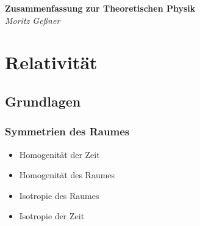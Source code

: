 \documentclass[11pt]{article}
\author{Moritz Geßner}
\numberwithin{equation}{section}
\begin{document}
  \newcommand{\xrowht}[2][0]
  {
    \addstackgap[.5\dimexpr#2\relax]{\vphantom{#1}}
  }
	\newcommand{\diff}
	{
		\mathrm{d}
	}
	\newcommand{\binomkoeff}[2]
	{
		\left(\begin{matrix}#1\\#2\end{matrix}\right)
	}
  \newcommand{\pvec}[1]
  {
    \vec{#1}\mkern2mu\vphantom{#1} %
  }
  \newcommand{\tder}[2] %
  {
    \frac{\diff #1}{\diff #2}
  }
  \newcommand{\pder}[2] %
  {
    \frac{\partial #1}{\partial #2}
  }
  \newcommand{\dpder}[2] %
  {
    \dfrac{\partial #1}{\partial #2}
  }
  \newcommand{\Nabla}
  {
    \vec{\nabla}
  }
  \newcommand{\unitvec}[1]
  {
    \vec{e}_{#1}
  }
  \newcommand{\com}[2] %
  {
    \left[#1,#2\right]
  }
  \newcommand{\anticom}[2] %
  {
    \left[#1,#2\right]_{+}
  }
  \newcommand{\konst}
  {
    \mathrm{konst.}
  }
  \newcommand{\customEq}[1]
  {
    \stackrel{#1}{=}
  }
  \newcommand*{\rom}[1]
  {
    \uppercase\expandafter{\romannumeral #1\relax}
  }

  \newcommand{\br}[1] %
  {
    \left( #1 \right)
  }
  \newcommand{\cbr}[1] %
  {
    \left\lbrace #1 \right\rbrace
  }
  \newcommand{\rbr}[1] %
  {
    \left[ #1 \right]
  }
  \newcommand{\abr}[1] %
  {
    \left\langle #1 \right\rangle
  }
  \newcommand{\vbr}[1] %
  {
    \left| #1 \right|
  }
  \newcommand{\tr}
  {
    \mathrm{tr}
  }


	\begin{center}
   	\Large\textbf{Zusammenfassung zur Theoretischen Physik} \\
		\large\textit{Moritz Geßner} \\
	\end{center}

	\tableofcontents
  \newpage

	\section{Relativität}
		\subsection{Grundlagen}
			\subsubsection{Symmetrien des Raumes}
        \begin{itemize}
          \item Homogenität der Zeit
          \item Homogenität des Raumes
          \item Isotropie des Raumes
          \item Isotropie der Zeit
        \end{itemize}
\end{document}
